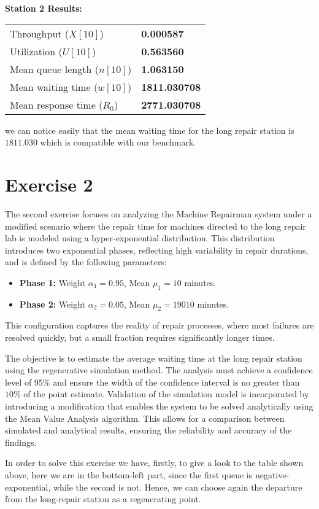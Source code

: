 \documentclass[12pt]{article}
\begin{document}
	\noindent\textbf{Station 2 Results:}
	\begin{table}[h!]
		\centering
		\begin{tabular}{@{}l l@{}}
			\toprule
			Throughput ($X[10]$)              & \textbf{0.000587} \\
			Utilization ($U[10]$)             & \textbf{0.563560} \\
			Mean queue length ($n[10]$)       & \textbf{1.063150} \\
			Mean waiting time ($w[10]$)       & \textbf{1811.030708} \\
			Mean response time ($R_0$)        & \textbf{2771.030708} \\
			\bottomrule
		\end{tabular}
	\end{table}
	
	
	we can notice easily that the mean waiting time for the long repair station is $1811.030$ which is compatible with our benchmark. 
	
	\section{Exercise 2}
	The second exercise focuses on analyzing the Machine Repairman system under a modified scenario where the repair time for machines directed to the long repair lab is modeled using a hyper-exponential distribution. This distribution introduces two exponential phases, reflecting high variability in repair durations, and is defined by the following parameters:
	
	\begin{itemize}
		\item \textbf{Phase 1:} Weight $\alpha_1 = 0.95$, Mean $\mu_1 = 10$ minutes.
		\item \textbf{Phase 2:} Weight $\alpha_2 = 0.05$, Mean $\mu_2 = 19010$ minutes.
	\end{itemize}
	
	This configuration captures the reality of repair processes, where most failures are resolved quickly, but a small fraction requires significantly longer times.
	
	The objective is to estimate the average waiting time at the long repair station using the regenerative simulation method. The analysis must achieve a confidence level of $95\%$ and ensure the width of the confidence interval is no greater than $10\%$ of the point estimate. Validation of the simulation model is incorporated by introducing a modification that enables the system to be solved analytically using the Mean Value Analysis algorithm. This allows for a comparison between simulated and analytical results, ensuring the reliability and accuracy of the findings.
	
	In order to solve this exercise we have, firstly, to give a look to the table shown above, here we are in the bottom-left part, since the first queue is negative-exponential, while the second is not. Hence, we can choose again the departure from the long-repair station as a regenerating point.
	
	
\end{document}
